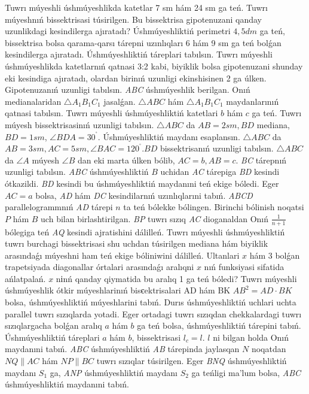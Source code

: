 Tuwrı múyeshli úshmúyeshlikda katetlar 7 sm hám 24 sm ga teń. Tuwrı múyeshnıń bissektrisasi túsirilgen. Bu bissektrisa gipotenuzani qanday uzunlikdagi kesindilerga ajıratadı?
Úshmúyeshliktiń perimetri \(4,5dm\) ga teń, bissektrisa bolsa qarama-qarsı tárepni uzınlıqları 6 hám 9 sm ga teń bolǵan kesindilerga ajıratadı. Úshmúyeshliktiń táreplari tabılsın.
Tuwrı múyeshli úshmúyeshlikda katetlarnıń qatnasi 3:2 kabi, biyiklik bolsa gipotenuzani shunday eki kesindiga ajıratadı, olardan birinıń uzunligi ekinshisinen 2 ga úlken. Gipotenuzanıń uzunligi tabılsın.
\emph{ABC} úshmúyeshlik berilgan. Onıń medianalaridan \(\bigtriangleup A_{1}B_{1}C_{1}\) jasalǵan. \(\bigtriangleup ABC\) hám \(\bigtriangleup A_{1}B_{1}C_{1}\) maydanlarınıń qatnasi tabılsın.
Tuwrı múyeshli úshmúyeshliktiń katetlari \(b\) hám \(c\) ga teń. Tuwrı múyesh bissektrisasinıń uzunligi tabılsın.
\(\bigtriangleup ABC\) da \(AB = 2sm,BD\) mediana, \(BD = 1sm\), \(\angle BDA = 30^{{^\circ}}\). Úshmúyeshliktiń maydanı esaplansın.
\(\bigtriangleup ABC\) da \(AB = 3sm,AC = 5sm,\angle BAC = 120^{{^\circ}}.BD\) bissektrisanıń uzunligi tabılsın.
\(\bigtriangleup ABC\) da \(\angle A\) múyesh \(\angle B\) dan eki marta úlken bólib, \(AC = b,AB = c\). \emph{BC} tárepnıń uzunligi tabılsın.
\emph{ABC} úshmúyeshliktiń \(B\) uchidan \emph{AC} tárepiga \emph{BD} kesindi ótkazildi. \emph{BD} kesindi bu úshmúyeshliktiń maydanıni teń ekige bóledi. Eger\(AC = a\) bolsa, \emph{AD} hám \emph{DC} kesindilarnıń uzınlıqlarıni tabıń.
\emph{ABCD} parallelogrammnıń \emph{AD} tárepi \(n\) ta teń bólekke bólingen. Birinchi bólinish noqatsi \(P\) hám \(B\) uch bilan birlashtirilgan. \emph{BP} tuwrı sızıq \emph{AC} dioganaldan Onıń \(\frac{1}{n + 1}\) bólegiga teń \emph{AQ} kesindi ajratishini dálilleń.
Tuwrı múyeshli úshmúyeshliktiń tuwrı burchagi bissektrisasi shu uchdan túsirilgen mediana hám biyiklik arasındaǵı múyeshni ham teń ekige bóliniwini dálilleń.
Ultanlari \(x\) hám 3 bolǵan trapetsiyada diagonallar órtalari arasındaǵı aralıqni \(x\) nıń funksiyasi sifatida ańlatpalań. \(x\) nіnń qanday qiymatida bu aralıq 1 ga teń bóledi?
Tuwrı múyeshli úshmúyeshlik ótkir múyeshlarinıń bisєektrisalari AD hám BK \(AB^{2} = AD \cdot BK\) bolsa, úshmúyeshliktiń múyeshlarini tabıń.
Durıs úshmúyeshliktiń uchlari uchta parallel tuwrı sızıqlarda yotadi. Eger ortadagi tuwrı sızıqdan chekkalardagi tuwrı sızıqlargacha bolǵan aralıq \(a\) hám \(b\) ga teń bolsa, úshmúyeshliktiń tárepini tabıń.
Úshmúyeshliktiń táreplari \(a\) hám \(b\), bissektrisasi \(l_{c} = l\). \(l\) ni bilgan holda Onıń maydanıni tabıń.
\emph{ABC} úshmúyeshliktiń \emph{AB} tárepinda jaylasqan \(N\) noqatdan \(NQ\| AC\) hám \(NP\| BC\) tuwrı sızıqlar túsirilgen. Eger \emph{BNQ} úshmúyeshliktiń maydanı \(S_{1}\) ga, \emph{ANP} úshmúyeshliktiń maydanı \(S_{2}\) ga teńligi ma'lum bolsa, \emph{ABC} úshmúyeshliktiń maydanıni tabıń.
